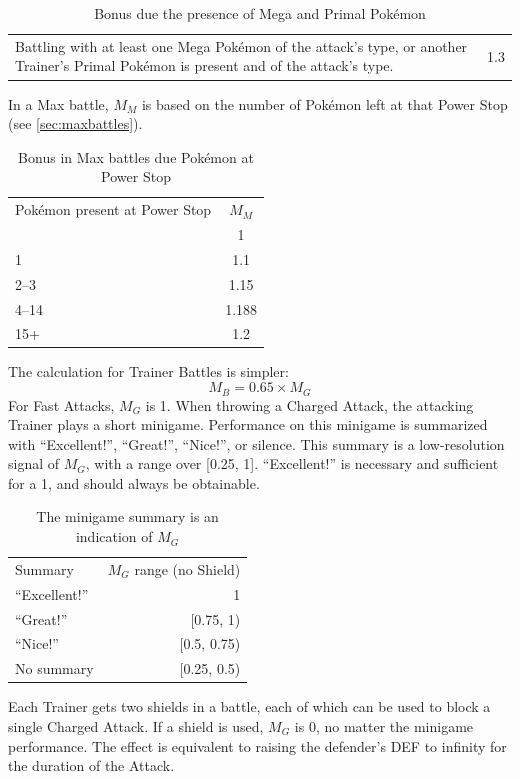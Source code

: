 \begin{itemize}
\begin{table}[h!]
\begin{tabular}{p{}c}
         Battling with at least one Mega Pokémon of the attack's type,
          or another Trainer's Primal Pokémon is present and of
          the attack's type. & 1.3 \\
       \end{tabular}
     \caption{Bonus due the presence of Mega and Primal Pokémon}
   \end{table}
   In a Max battle, $M_M$ is based on the number of Pokémon left at that Power Stop
     (see \autoref{sec:maxbattles}).
   \begin{table}[h!]
     \centering
       \begin{tabular}{lc}
         Pokémon present at Power Stop & $M_M$ \\
         \Midrule
         0 & 1 \\
         1 & 1.1 \\
         2--3 & 1.15 \\
         4--14 & 1.188 \\
         15+ & 1.2 \\
       \end{tabular}
     \caption{Bonus in Max battles due Pokémon at Power Stop}
   \end{table}
\end{itemize}
The calculation for Trainer Battles is simpler:
\[ M_B = 0.65 \times M_G \]
For Fast Attacks, $M_G$ is 1.
When throwing a Charged Attack, the attacking Trainer plays a short minigame.
Performance on this minigame is summarized with ``Excellent!'', ``Great!'',
``Nice!'', or silence.
This summary is a low-resolution signal of $M_G$, with a range over [0.25, 1].
``Excellent!'' is necessary and sufficient for a 1, and should always be obtainable.
\begin{table}
\centering
\begin{tabular}{l r}
Summary & $M_G$ range (no Shield) \\
\Midrule
``Excellent!'' & 1 \\
``Great!'' & [0.75, 1) \\
``Nice!'' & [0.5, 0.75) \\
No summary & [0.25, 0.5) \\
\end{tabular}
\caption{The minigame summary is an indication of $M_G$}
\end{table}
Each Trainer gets two shields in a battle, each of which can be used
 to block a single Charged Attack.
If a shield is used, $M_G$ is 0, no matter the minigame performance.
The effect is equivalent to raising the defender's DEF to infinity for the
  duration of the Attack.

